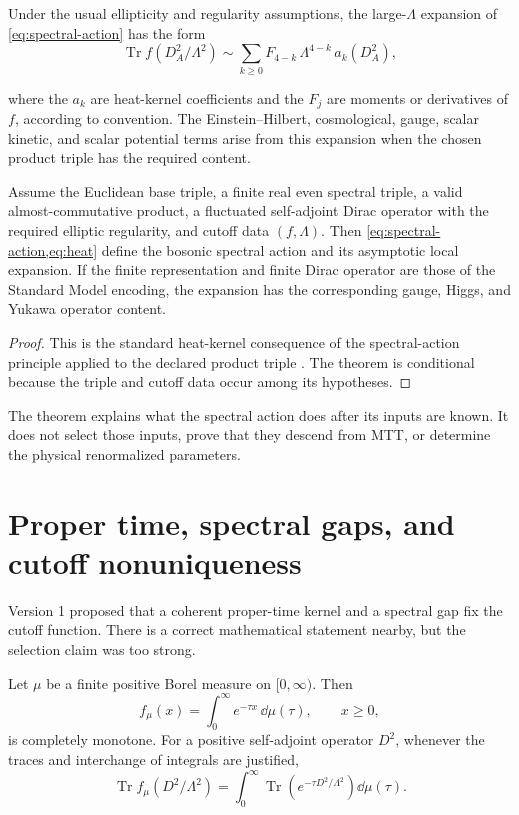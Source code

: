 \documentclass[11pt]{article}
\DeclareMathOperator{\Tr}{Tr}
\begin{document}
Under the usual ellipticity and regularity assumptions, the large-$\Lambda$
expansion of \cref{eq:spectral-action} has the form
\begin{equation}\label{eq:heat}
 \Tr f(D_A^2/\Lambda^2)
 \sim
 \sum_{k\geq 0} F_{4-k}\,\Lambda^{4-k}\,a_k(D_A^2),
\end{equation}
\par\smallskip\noindent
where the $a_k$ are heat-kernel coefficients and the $F_j$ are moments or
derivatives of $f$, according to convention.  The Einstein--Hilbert,
cosmological, gauge, scalar kinetic, and scalar potential terms arise from
this expansion when the chosen product triple has the required content.

\begin{theorem}\label{thm:standard}
Assume the Euclidean base triple, a finite real even spectral triple, a valid
almost-commutative product, a fluctuated self-adjoint Dirac operator with the
required elliptic regularity, and cutoff data $(f,\Lambda)$.  Then
\cref{eq:spectral-action,eq:heat} define the bosonic spectral action and its
asymptotic local expansion.  If the finite representation and finite Dirac
operator are those of the Standard Model encoding, the expansion has the
corresponding gauge, Higgs, and Yukawa operator content.
\end{theorem}

\begin{proof}
This is the standard heat-kernel consequence of the spectral-action principle
applied to the declared product triple \cite{CC1996,CCM2006}.  The theorem is
conditional because the triple and cutoff data occur among its hypotheses.
\end{proof}

The theorem explains what the spectral action does after its inputs are known.
It does not select those inputs, prove that they descend from MTT, or determine
the physical renormalized parameters.

\section{Proper time, spectral gaps, and cutoff nonuniqueness}

Version 1 proposed that a coherent proper-time kernel and a spectral gap fix the
cutoff function.  There is a correct mathematical statement nearby, but the
selection claim was too strong.

\begin{proposition}\label{prop:proper}
Let $\mu$ be a finite positive Borel measure on $[0,\infty)$.  Then
\[
  f_\mu(x)=\int_0^\infty e^{-\tau x}\,\dd\mu(\tau),
  \qquad x\geq 0,
\]
is completely monotone.  For a positive self-adjoint operator $D^2$, whenever
the traces and interchange of integrals are justified,
\[
  \Tr f_\mu(D^2/\Lambda^2)
  =
  \int_0^\infty
  \Tr\!\left(e^{-\tau D^2/\Lambda^2}\right)\dd\mu(\tau).
\]
\end{proposition}
\end{document}
